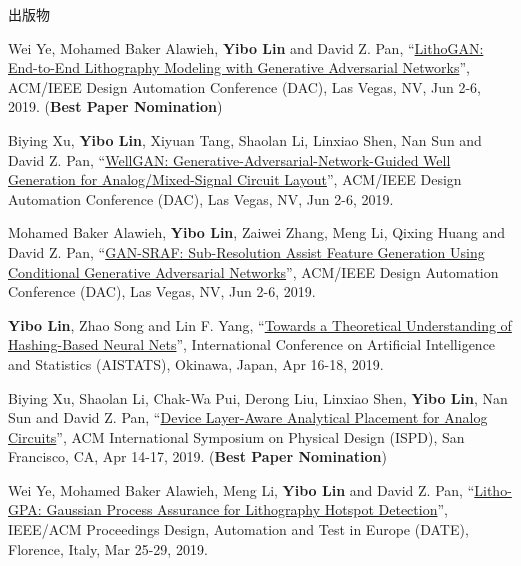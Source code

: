 \begin{rSection}{出版物}
\begin{description}[font=\normalfont, rightmargin=2em]
\item[{[C27]}]{
        Wei Ye, Mohamed Baker Alawieh, \textbf{Yibo Lin} and David Z. Pan, 
    ``\href{https://doi.org/10.1145/3316781.3317852}{LithoGAN: End-to-End Lithography Modeling with Generative Adversarial Networks}'', 
    ACM/IEEE Design Automation Conference (DAC), Las Vegas, NV, Jun 2-6, 2019.
    (\textbf{Best Paper Nomination})
}
            

\item[{[C26]}]{
        Biying Xu, \textbf{Yibo Lin}, Xiyuan Tang, Shaolan Li, Linxiao Shen, Nan Sun and David Z. Pan, 
    ``\href{https://doi.org/10.1145/3316781.3317930}{WellGAN: Generative-Adversarial-Network-Guided Well Generation for Analog/Mixed-Signal Circuit Layout}'', 
    ACM/IEEE Design Automation Conference (DAC), Las Vegas, NV, Jun 2-6, 2019.
    
}
            

\item[{[C25]}]{
        Mohamed Baker Alawieh, \textbf{Yibo Lin}, Zaiwei Zhang, Meng Li, Qixing Huang and David Z. Pan, 
    ``\href{https://doi.org/10.1145/3316781.3317832}{GAN-SRAF: Sub-Resolution Assist Feature Generation Using Conditional Generative Adversarial Networks}'', 
    ACM/IEEE Design Automation Conference (DAC), Las Vegas, NV, Jun 2-6, 2019.
    
}
            

\item[{[C24]}]{
        \textbf{Yibo Lin}, Zhao Song and Lin F. Yang, 
    ``\href{https://arxiv.org/abs/1812.10244}{Towards a Theoretical Understanding of Hashing-Based Neural Nets}'', 
    International Conference on Artificial Intelligence and Statistics (AISTATS), Okinawa, Japan, Apr 16-18, 2019.
    
}
            

\item[{[C23]}]{
        Biying Xu, Shaolan Li, Chak-Wa Pui, Derong Liu, Linxiao Shen, \textbf{Yibo Lin}, Nan Sun and David Z. Pan, 
    ``\href{https://doi.org/10.1145/3299902.3309751}{Device Layer-Aware Analytical Placement for Analog Circuits}'', 
    ACM International Symposium on Physical Design (ISPD), San Francisco, CA, Apr 14-17, 2019.
    (\textbf{Best Paper Nomination})
}
            

\item[{[C22]}]{
        Wei Ye, Mohamed Baker Alawieh, Meng Li, \textbf{Yibo Lin} and David Z. Pan, 
    ``\href{https://doi.org/10.23919/DATE.2019.8714960}{Litho-GPA: Gaussian Process Assurance for Lithography Hotspot Detection}'', 
    IEEE/ACM Proceedings Design, Automation and Test in Europe (DATE), Florence, Italy, Mar 25-29, 2019.
    
}
\end{description}
\end{rSection}
